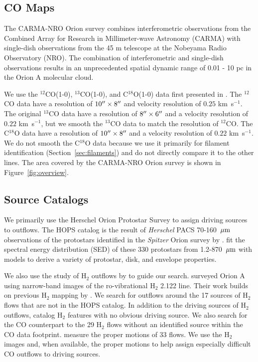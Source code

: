 \documentclass[twocolumn]{aastex63}
\newcommand{\kms}{km~s$^{-1}$}
\newcommand{\co}[1][]{\ensuremath{^{#1}}CO}
\begin{document}
\subsection{CO Maps}
The CARMA-NRO Orion survey combines interferometric observations from the Combined Array for Research in Millimeter-wave Astronomy (CARMA) with single-dish observations from the 45 m telescope at the Nobeyama Radio Observatory (NRO). The combination of interferometric and single-dish observations results in an unprecedented spatial dynamic range of 0.01 - 10 pc in the Orion A molecular cloud.

We use the \co[12](1-0), \co[13](1-0), and C$^{18}$O(1-0) data first presented in \citet{Kong18}. The \co[12]{} data have a resolution of $10\mbox{$^{\prime\prime}$}\times8\mbox{$^{\prime\prime}$}$ and velocity resolution of $0.25$ \kms{}. The original \co[13]{} data have a resolution of $8\mbox{$^{\prime\prime}$}\times6\mbox{$^{\prime\prime}$}$ and a velocity resolution of $0.22$ \kms{}, but we smooth the \co[13]{} data to match the resolution of \co[12]{}. The C$^{18}$O data have a resolution of $10\mbox{$^{\prime\prime}$}\times8\mbox{$^{\prime\prime}$}$ and a velocity resolution of $0.22$ \kms{}. We do not smooth the C$^{18}$O data because we use it primarily for filament identification (Section~\ref{sec:filaments}) and do not directly compare it to the other lines. The area covered by the CARMA-NRO Orion survey is shown in Figure~\ref{fig:overview}.

\subsection{Source Catalogs}
We primarily use the Herschel Orion Protostar Survey \citep[HOPS;][]{Furlan16} to assign driving sources to outflows. The HOPS catalog is the result of \emph{Herschel} PACS 70-160~$\mbox{$\mu$m}{}$ observations of the protostars identified in the \emph{Spitzer} Orion survey by \citet{Megeath12}. \citet{Furlan16} fit the spectral energy distribution (SED) of these 330 protostars from 1.2-870~$\mbox{$\mu$m}{}$ with models to derive a variety of protostar, disk, and envelope properties.

We also use the study of H$_2$ outflows by \citet{Davis09} to guide our search. \citet{Davis09} surveyed Orion A using narrow-band images of the ro-vibrational H$_2$ 2.122 \micron{} line. Their work builds on previous H$_2$ mapping by \citet{Stanke02}. We search for outflows around the 17 sources of H$_2$ flows that are not in the HOPS catalog. In addition to the driving sources of H$_2$ outflows, \citet{Davis09} catalog H$_2$ features with no obvious driving source. We also search for the CO counterpart to the 29 H$_2$ flows without an identified source within the CO data footprint. \citet{Davis09} measure the proper motions of 33 flows. We use the H$_2$ images and, when available, the proper motions to help assign especially difficult CO outflows to driving sources.
\end{document}
